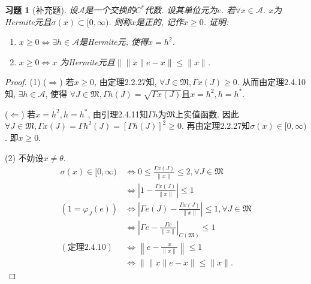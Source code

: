 \documentclass[UTF8,twoside]{ctexbook}
\newtheorem{exercise}{习题}[section]
\newcommand{\h}{\mathscr}
\numberwithin{equation}{section}
\begin{document}
	\begin{exercise}[补充题]
		设$\h A$是一个交换的$C^*$代数. 设其单位元为$e$. 若$\forall x\in\h A$. $x$为Hermite元且$\sigma(x)\subset [0,\infty)$. 则称$x$是正的, 记作$x\geq 0$. 证明:
		\begin{enumerate}[(1)]
			\item$x\geq 0\Longleftrightarrow\exists h\in\h A$是Hermite元, 使得$x=h^2$.
			\item$x\geq 0\Longleftrightarrow x$ 为Hermite元且$\|\|x\|e-x\|\leq\|x\|$.
		\end{enumerate}
	\end{exercise}
	\begin{proof}
		(1) ($\Rightarrow$) 若$x\geq 0$, 由定理2.2.27知, $\forall J\in\mathfrak M, \Gamma x(J)\geq 0$. 从而由定理2.4.10知, $\exists h\in\h A$, 使得 $\forall J\in\mathfrak M, \Gamma h(J)=\sqrt{\Gamma x(J)}$且$x=h^2,h=h^*$.

		($\Leftarrow$) 若$x=h^2,h=h^*$, 由引理2.4.11知$\Gamma h$为$\mathfrak M$上实值函数. 因此$\forall J\in\mathfrak M, \Gamma x(J)=\Gamma h^2(J)=[\Gamma h(J)]^2\geq 0$. 再由定理2.2.27知$\sigma(x)\in [0,\infty)$. 即$x\geq 0$.

		(2) 不妨设$x\neq\theta$.
		\[\begin{aligned}
		\sigma(x)\in [0,\infty) &\Leftrightarrow 0\leq\frac{\Gamma x(J)}{\|x\|}\leq 2,\forall J\in\mathfrak M\\
		&\Leftrightarrow \left|1-\frac{\Gamma x(J)}{\|x\|}\right|\leq 1 \\
		(1=\varphi_J(e))&\Leftrightarrow \left| \Gamma e(J)-\frac{\Gamma x(J)}{\|x\|} \right|\leq 1,\forall J\in\mathfrak M\\
		&\Leftrightarrow \left|\Gamma e-\frac{\Gamma x}{\|x\|}\right|_{C(\mathfrak M)}\leq 1\\
		(\text{定理2.4.10})& \Leftrightarrow \left\|e-\frac{x}{\|x\|}\right\|\leq 1\\
		&\Leftrightarrow \left\|\|x\|e-x\right\|\leq \|x\|.
		\end{aligned}
		\]
	\end{proof}
\end{document}
